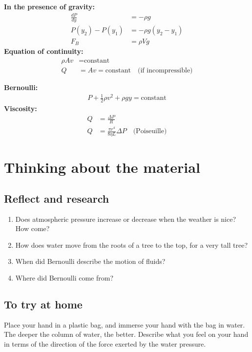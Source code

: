 {{\begin{chapterSummary}
\end{chapterSummary}

\newpage
\begin{importantEquations}
\begin{multicols}{2}
\textbf{In the presence of gravity:}
\begin{align*}
\frac{dP}{dy}&=-\rho g\\
P(y_2)-P(y_1)&=-\rho g(y_2-y_1)\\
F_B&=\rho Vg
\end{align*}
\textbf{Equation of continuity:}
\begin{align*}
\rho Av&=\textrm{constant}\\
Q&=Av=\textrm{constant}\quad \textrm{(if incompressible)}
\end{align*}
\columnbreak

\textbf{Bernoulli:}
\begin{align*}
P+\frac{1}{2}\rho v^2+\rho gy=\textrm{constant}
\end{align*}
\textbf{Viscosity:}
\begin{align*}
Q&=\frac{\Delta P}{R}\\
Q&= \frac{\pi r^4}{8\eta L}\Delta P \quad \textrm{(Poiseuille)}
\end{align*}
\end{multicols}
\end{importantEquations}


\newpage
\section{Thinking about the material}
\subsection{Reflect and research}

\begin{enumerate}
\item Does atmospheric pressure increase or decrease when the weather is nice? How come?
\item How does water move from the roots of a tree to the top, for a very tall tree?
\item When did Bernoulli describe the motion of fluids?
\item Where did Bernoulli come from?
\end{enumerate}
\subsection{To try at home}
Place your hand in a plastic bag, and immerse your hand with the bag in water. The deeper the column of water, the better. Describe what you feel on your hand in terms of the direction of the force exerted by the water pressure.

}}

